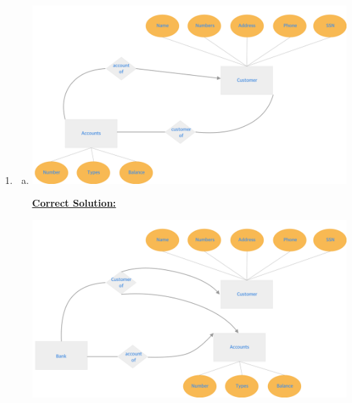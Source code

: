 \documentclass[12pt]{article}
\begin{document}
\begin{enumerate}[1.]
\begin{itemize}
        \bigskip



    \end{itemize}

    \item

    \begin{enumerate}[a)]
        \item

        \begin{center}
        \includegraphics[width=\linewidth]{images/worksheet_14_solution_15.png}
        \end{center}

        \bigskip

        \begin{mdframed}
            \underline{\textbf{Correct Solution:}}

            \bigskip

            \begin{center}
            \includegraphics[width=\linewidth]{images/worksheet_14_solution_17.png}
            \end{center}
        \end{mdframed}


\end{enumerate}
\end{enumerate}
\end{document}
